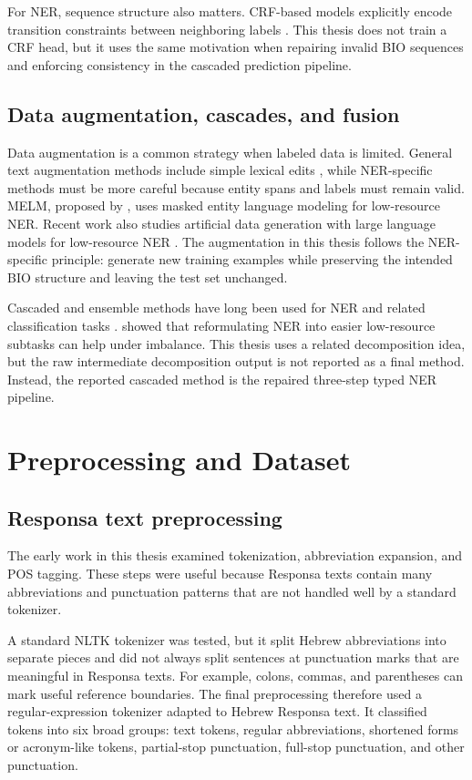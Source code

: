 \documentclass[12pt,a4paper]{report}
\begin{document}
For NER, sequence structure also matters. CRF-based models explicitly encode transition constraints between neighboring labels \citep{lafferty2001crf,ma2016}. This thesis does not train a CRF head, but it uses the same motivation when repairing invalid BIO sequences and enforcing consistency in the cascaded prediction pipeline.

\section{Data augmentation, cascades, and fusion}
Data augmentation is a common strategy when labeled data is limited. General text augmentation methods include simple lexical edits \citep{wei2019eda}, while NER-specific methods must be more careful because entity spans and labels must remain valid. MELM, proposed by \citet{zhou2022melm}, uses masked entity language modeling for low-resource NER. Recent work also studies artificial data generation with large language models for low-resource NER \citep{santoso2024}. The augmentation in this thesis follows the NER-specific principle: generate new training examples while preserving the intended BIO structure and leaving the test set unchanged.

Cascaded and ensemble methods have long been used for NER and related classification tasks \citep{florian2003,dinarelli2011,awasthy2020,dietterich2000}. \citet{nguyen2023auc} showed that reformulating NER into easier low-resource subtasks can help under imbalance. This thesis uses a related decomposition idea, but the raw intermediate decomposition output is not reported as a final method. Instead, the reported cascaded method is the repaired three-step typed NER pipeline.

\chapter{Preprocessing and Dataset}
\section{Responsa text preprocessing}
The early work in this thesis examined tokenization, abbreviation expansion, and POS tagging. These steps were useful because Responsa texts contain many abbreviations and punctuation patterns that are not handled well by a standard tokenizer.

A standard NLTK tokenizer \citep{bird2009nltk} was tested, but it split Hebrew abbreviations into separate pieces and did not always split sentences at punctuation marks that are meaningful in Responsa texts. For example, colons, commas, and parentheses can mark useful reference boundaries. The final preprocessing therefore used a regular-expression tokenizer adapted to Hebrew Responsa text. It classified tokens into six broad groups: text tokens, regular abbreviations, shortened forms or acronym-like tokens, partial-stop punctuation, full-stop punctuation, and other punctuation.
\end{document}
